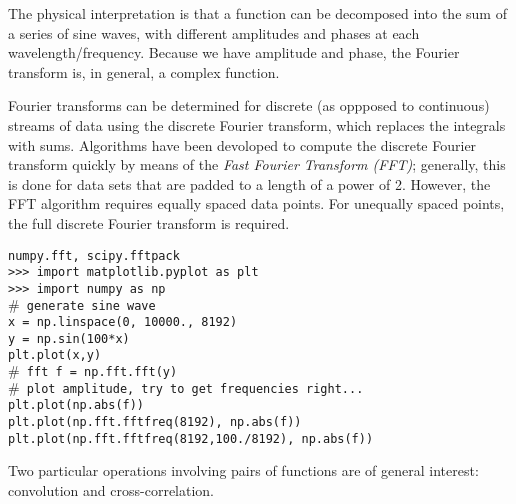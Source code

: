 \documentclass[12pt]{article}
\begin{document}
The physical interpretation is that a function can be decomposed into the sum
of a series of sine waves, with different amplitudes and phases at each
wavelength/frequency. Because we have amplitude and phase, the Fourier
transform is, in general, a complex function.

Fourier transforms can be determined for discrete (as oppposed to continuous)
streams of data using the discrete Fourier transform, which replaces the
integrals with sums. Algorithms have been devoloped to compute the discrete
Fourier transform quickly by means of the \emph{Fast Fourier Transform (FFT)};
generally, this is done for data sets that are padded to a length of a power
of 2. However, the FFT algorithm requires equally spaced data points. For
unequally spaced points, the full discrete Fourier transform is required.

\texttt{numpy.fft, scipy.fftpack \\
>>> import matplotlib.pyplot as plt \\
>>> import numpy as np \\
$\#$ generate sine wave \\
x = np.linspace(0, 10000., 8192) \\
y = np.sin(100*x) \\
plt.plot(x,y) \\
$\#$ fft
f = np.fft.fft(y) \\
$\#$ plot amplitude, try to get frequencies right... \\
plt.plot(np.abs(f)) \\
plt.plot(np.fft.fftfreq(8192), np.abs(f)) \\
plt.plot(np.fft.fftfreq(8192,100./8192), np.abs(f))}

Two particular operations involving pairs of functions are of general interest:
convolution and cross-correlation.
\end{document}
